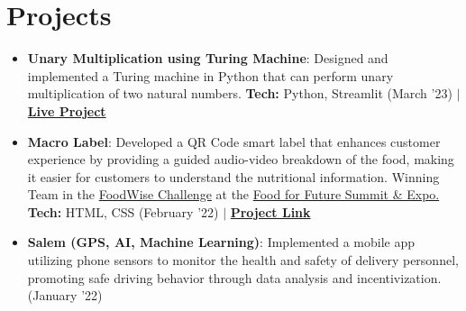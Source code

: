 \documentclass[a4paper,20pt]{article}
\newcommand{\resumeItem}[2] {
	\item\small{
		\textbf{#1}{: #2 \vspace{-2pt}}
	}
}
\newcommand{\resumeSubItem}[2]{\resumeItem{#1}{#2}\vspace{-3pt}}
\newcommand{\resumeSubHeadingListStart}{\begin{itemize}[leftmargin=*]}
\newcommand{\resumeSubHeadingListEnd}{\end{itemize}}
\begin{document}
\section{Projects}
	\resumeSubHeadingListStart
		\resumeSubItem{Unary Multiplication using Turing Machine}{Designed and implemented a Turing machine in Python that can perform unary multiplication of two natural numbers. \textbf{Tech:} Python, Streamlit (March '23) $\vert$ \href{https://f29fb-assignment.streamlit.app/}{\textbf{Live Project}}}
		\vspace{2pt}
		\resumeSubItem{Macro Label}{Developed a QR Code smart label that enhances customer experience by providing a guided audio-video breakdown of the food, making it easier for customers to understand the nutritional information. Winning Team in the \href{https://www.foodforfuturesummit.com/foodwise}{FoodWise Challenge} at the \href{https://www.foodforfuturesummit.com/}{Food for Future Summit \& Expo.} \textbf{Tech:} HTML, CSS (February '22) $\vert$ \href{https://github.com/cr2007/foodqrcode}{\textbf{Project Link}}}
		\vspace{2pt}
		\resumeSubItem{Salem (GPS, AI, Machine Learning)}{Implemented a mobile app utilizing phone sensors to monitor the health and safety of delivery personnel, promoting safe driving behavior through data analysis and incentivization. (January '22)}
		\vspace{2pt}
	\resumeSubHeadingListEnd
	\vspace{-5pt}
\end{document}
